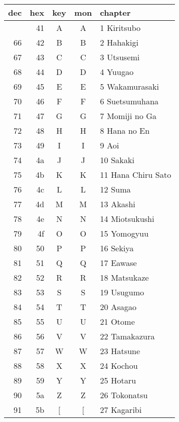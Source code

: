 \documentclass{mitsuba}
\newcommand\genji[1]{{\genjiface #1}}
\begin{document}
\begin{tabular}{rrccl}
 dec & hex & key & mon & chapter \\ \hline \bigstrut[t]
  65 & 41 & A & \genji{\large A} & 1 Kiritsubo \\
  66 & 42 & B & \genji{\large B} & 2 Hahakigi \\
  67 & 43 & C & \genji{\large C} & 3 Utsusemi \\
  68 & 44 & D & \genji{\large D} & 4 Yuugao \\
  69 & 45 & E & \genji{\large E} & 5 Wakamurasaki \\
  70 & 46 & F & \genji{\large F} & 6 Suetsumuhana \\
  71 & 47 & G & \genji{\large G} & 7 Momiji no Ga \\
  72 & 48 & H & \genji{\large H} & 8 Hana no En \\
  73 & 49 & I & \genji{\large I} & 9 Aoi \\
  74 & 4a & J & \genji{\large J} & 10 Sakaki \\
  75 & 4b & K & \genji{\large K} & 11 Hana Chiru Sato \\
  76 & 4c & L & \genji{\large L} & 12 Suma \\
  77 & 4d & M & \genji{\large M} & 13 Akashi \\
  78 & 4e & N & \genji{\large N} & 14 Miotsukushi \\
  79 & 4f & O & \genji{\large O} & 15 Yomogyuu \\
  80 & 50 & P & \genji{\large P} & 16 Sekiya \\
  81 & 51 & Q & \genji{\large Q} & 17 Eawase \\
  82 & 52 & R & \genji{\large R} & 18 Matsukaze \\
  83 & 53 & S & \genji{\large S} & 19 Usugumo \\
  84 & 54 & T & \genji{\large T} & 20 Asagao \\
  85 & 55 & U & \genji{\large U} & 21 Otome \\
  86 & 56 & V & \genji{\large V} & 22 Tamakazura \\
  87 & 57 & W & \genji{\large W} & 23 Hatsune \\
  88 & 58 & X & \genji{\large X} & 24 Kochou \\
  89 & 59 & Y & \genji{\large Y} & 25 Hotaru \\
  90 & 5a & Z & \genji{\large Z} & 26 Tokonatsu \\
  91 & 5b & [ & \genji{\large [} & 27 Kagaribi \\
\end{tabular}
\end{document}
